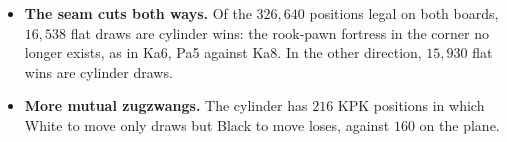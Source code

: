 \begin{itemize}
\item \textbf{The seam cuts both ways.} Of the $326{,}640$ positions legal on both boards, $16{,}538$ flat draws
  are cylinder wins: the rook-pawn fortress in the corner no longer exists, as in Ka6, Pa5 against Ka8.
  In the other direction, $15{,}930$ flat wins are cylinder draws.
\item \textbf{More mutual zugzwangs.} The cylinder has $216$ KPK positions in which White to move only draws
  but Black to move loses, against $160$ on the plane.
\end{itemize}
